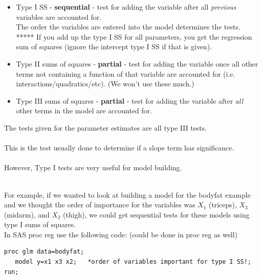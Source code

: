 \begin{itemize}
\item Type I SS - \textbf{sequential} - test for adding the variable after all \textit{previous} variables are accounted for.\\
The order the variables are entered into the model determines the tests.\\
***** If you add up the type I SS for all parameters, you get the regression sum of squares (ignore the intercept type I SS if that is given).

\item Type II sums of squares - \textbf{partial} - test for adding the variable once all other terms not containing a function of that variable are accounted for (i.e. interactions/quadratics/etc). (We won't use these much.)

\item Type III sums of squares - \textbf{partial} - test for adding the variable after \textit{all} other terms in the model are accounted for.
\end{itemize}

The tests given for the parameter estimates are all type III tests.\\~\\
This is the test usually done to determine if a slope term has significance. \\~\\

However, Type I tests are very useful for model building. \\~\\

\newpage

For example, if we wanted to look at building a model for the bodyfat example and we thought the order of importance for the variables was $X_1$ (triceps), $X_3$ (midarm), and $X_2$ (thigh), we could get sequential tests for these models using type I sums of squares.\\

In SAS proc reg use the following code: (could be done in proc reg as well)\\
\begin{small}
\begin{verbatim}
proc glm data=bodyfat;
   model y=x1 x3 x2;   *order of variables important for type I SS!;
run;
\end{verbatim}
\end{small}

